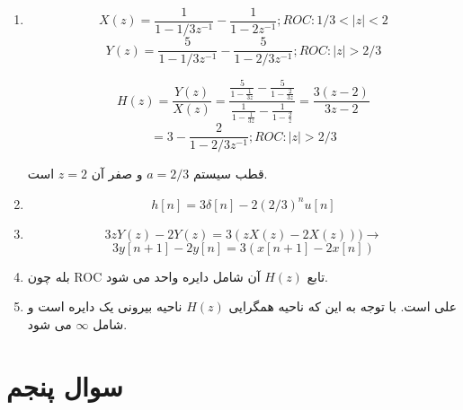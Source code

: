 \documentclass[12pt]{article}
\begin{document}
\begin{enumerate}[label = \Alph*)]
	\item 

$$X(z) = \frac{1}{1-1/3 z^{-1}} - \frac{1}{1- 2 z^{-1}} ; ROC: 1/3<|z|<2$$
$$Y(z)= \frac{5}{1 - 1/3 z^{-1}} - \frac{5}{1 - 2/3 z^{-1}} ; ROC:|z| >2/3$$

$$H(z) = \frac{Y(z)}{X(z)} =\frac{\frac{5}{1-\frac{1}{3 z}}-\frac{5}{1-\frac{2}{3 z}}}{\frac{1}{1-\frac{1}{3 z}}-\frac{1}{1-\frac{2}{z}}} =\frac{3 (z-2)}{3 z-2}$$
$$=3 - \frac{2}{1 - 2/3 z^{-1}} ; ROC: |z| > 2/3  $$


قطب سیستم $a = 2/3$ و صفر آن $z=2$ است.


\item
$$h[n] = 3\delta[n] - 2 (2/3)^n u[n]$$


\item

$$3z Y(z) -2 Y(z) = 3(zX(z) - 2 X(z))) \rightarrow$$
$$3 y[n+1] - 2y[n] = 3(x[n+1] - 2x[n])$$

\item

بله چون ROC تابع $H(z)$ آن شامل دایره واحد می شود.

\item

علی است. با توجه به این که ناحیه همگرایی $H(z)$ ناحیه بیرونی یک دایره است و شامل $\infty$ می شود.
\end{enumerate}

\section{سوال پنجم}
\end{document}
